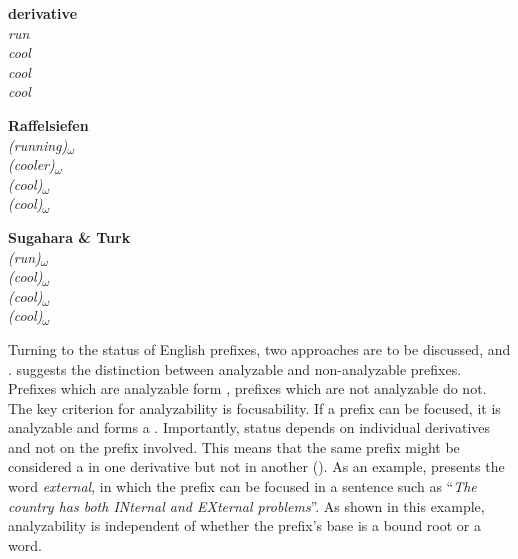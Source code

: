 \begin{multicols}{3}

	\begin{exe}
	
	\ex		
		\textbf{derivative}	\\
		\textit{run}	\\
		\textit{cool} 	\\
		 \textit{cool}\\
		\textit{cool} \\			
		\columnbreak 
		
		\textbf{Raffelsiefen }	\\
		\textit{(running)\textsubscript{$\omega$}} 	\\
		\textit{(cooler)\textsubscript{$\omega$}} \\
		\textit{(cool)\textsubscript{$\omega$}} \\
		\textit{(cool)\textsubscript{$\omega$}} \\
		\columnbreak
			
		\textbf{Sugahara \& Turk}	\\
		\textit{(run)\textsubscript{$\omega$}} \\
		\textit{(cool)\textsubscript{$\omega$}} 	\\	
		\textit{(cool)\textsubscript{$\omega$}}\\
		\textit{(cool)\textsubscript{$\omega$}}	\\

	\end{exe}
	
\end{multicols}


Turning to the  status of English prefixes, two approaches are to be discussed, \cite{Wennerstrom.1993} and \cite{Raffelsiefen.1999}. \cite{Wennerstrom.1993} suggests the distinction between analyzable and non-analyzable prefixes. Prefixes which are analyzable form , prefixes which are not analyzable do not. The key criterion for analyzability is focusability. If a prefix can be focused, it is analyzable and forms a . 
Importantly,  status depends on individual derivatives and not on the prefix involved. This means that the same prefix might be considered a  in one derivative but not in another (\citealt[314]{Wennerstrom.1993}). 
As an example, \citet[311]{Wennerstrom.1993} presents the word \textit{external}, in which the prefix  can be focused in a sentence such as ``\textit{The country has both INternal and EXternal problems}''. As shown in this example, analyzability is independent of whether the prefix's base is a bound root or a word. 

